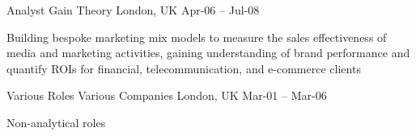 \begin{cventries}
  \cventry
    {Analyst} %
    {Gain Theory} %
    {London, UK} %
    {Apr-06 – Jul-08} %
    {
      \begin{cvitems} %
        \item {Building bespoke marketing mix models to measure the sales effectiveness of media and marketing activities, gaining understanding of brand performance and quantify ROIs for financial, telecommunication, and e-commerce clients}
      \end{cvitems}
    }
    
  \cventry
    {Various Roles} %
    {Various Companies} %
    {London, UK} %
    {Mar-01 – Mar-06} %
    {
      \begin{cvitems} %
        \item {Non-analytical roles}
      \end{cvitems}
    }

\end{cventries}
